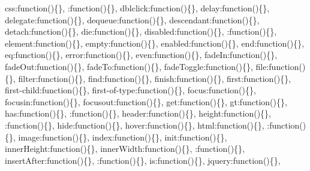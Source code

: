 {\begin{DoxyParamCaption}
\textquotesingle{}css\textquotesingle{}\+:function()\{\}, \textquotesingle{}\+:function()\{\}, \textquotesingle{}dblclick\textquotesingle{}\+:function()\{\}, \textquotesingle{}delay\textquotesingle{}\+:function()\{\}, \textquotesingle{}delegate\textquotesingle{}\+:function()\{\}, \textquotesingle{}dequeue\textquotesingle{}\+:function()\{\}, \textquotesingle{}descendant\textquotesingle{}\+:function()\{\}, \textquotesingle{}detach\textquotesingle{}\+:function()\{\}, \textquotesingle{}die\textquotesingle{}\+:function()\{\}, \textquotesingle{}disabled\textquotesingle{}\+:function()\{\}, \textquotesingle{}\+:function()\{\}, \textquotesingle{}element\textquotesingle{}\+:function()\{\}, \textquotesingle{}empty\textquotesingle{}\+:function()\{\}, \textquotesingle{}enabled\textquotesingle{}\+:function()\{\}, \textquotesingle{}end\textquotesingle{}\+:function()\{\}, \textquotesingle{}eq\textquotesingle{}\+:function()\{\}, \textquotesingle{}error\textquotesingle{}\+:function()\{\}, \textquotesingle{}even\textquotesingle{}\+:function()\{\}, \textquotesingle{}fade\+In\textquotesingle{}\+:function()\{\}, \textquotesingle{}fade\+Out\textquotesingle{}\+:function()\{\}, \textquotesingle{}fade\+To\textquotesingle{}\+:function()\{\}, \textquotesingle{}fade\+Toggle\textquotesingle{}\+:function()\{\}, \textquotesingle{}file\textquotesingle{}\+:function()\{\}, \textquotesingle{}filter\textquotesingle{}\+:function()\{\}, \textquotesingle{}find\textquotesingle{}\+:function()\{\}, \textquotesingle{}finish\textquotesingle{}\+:function()\{\}, \textquotesingle{}first\textquotesingle{}\+:function()\{\}, \textquotesingle{}first-\/child\textquotesingle{}\+:function()\{\}, \textquotesingle{}first-\/of-\/type\textquotesingle{}\+:function()\{\}, \textquotesingle{}focus\textquotesingle{}\+:function()\{\}, \textquotesingle{}focusin\textquotesingle{}\+:function()\{\}, \textquotesingle{}focusout\textquotesingle{}\+:function()\{\}, \textquotesingle{}get\textquotesingle{}\+:function()\{\}, \textquotesingle{}gt\textquotesingle{}\+:function()\{\}, \textquotesingle{}has\textquotesingle{}\+:function()\{\}, \textquotesingle{}\+:function()\{\}, \textquotesingle{}header\textquotesingle{}\+:function()\{\}, \textquotesingle{}height\textquotesingle{}\+:function()\{\}, \textquotesingle{}\+:function()\{\}, \textquotesingle{}hide\textquotesingle{}\+:function()\{\}, \textquotesingle{}hover\textquotesingle{}\+:function()\{\}, \textquotesingle{}html\textquotesingle{}\+:function()\{\}, \textquotesingle{}\+:function()\{\}, \textquotesingle{}image\textquotesingle{}\+:function()\{\}, \textquotesingle{}index\textquotesingle{}\+:function()\{\}, \textquotesingle{}init\textquotesingle{}\+:function()\{\}, \textquotesingle{}inner\+Height\textquotesingle{}\+:function()\{\}, \textquotesingle{}inner\+Width\textquotesingle{}\+:function()\{\}, \textquotesingle{}\+:function()\{\}, \textquotesingle{}insert\+After\textquotesingle{}\+:function()\{\}, \textquotesingle{}\+:function()\{\}, \textquotesingle{}is\textquotesingle{}\+:function()\{\}, \textquotesingle{}jquery\textquotesingle{}\+:function()\{\}, 
\end{DoxyParamCaption}}
